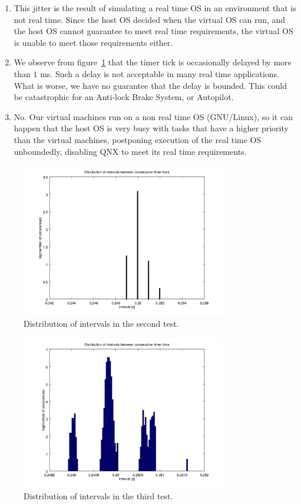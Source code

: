 \documentclass[a4paper,twoside,11pt]{article}
\begin{document}
\begin{enumerate}
 \item This jitter is the result of simulating a real time OS in an environment that is not real time. Since the host OS decided when the virtual OS can run, and the host OS cannot guarantee to meet real time requirements, the virtual OS is unable to meet those requirements either.
 
 \item We observe from figure~\ref{fig:interval-jitter} that the timer tick is occasionally delayed by more than $1$ ms. Such a delay is not acceptable in many real time applications. What is worse, we have no guarantee that the delay is bounded. This could be catastrophic for an Anti-lock Brake System, or Autopilot.
 
 \item No. Our virtual machines run on a non real time OS (GNU/Linux), so it can happen that the host OS is very busy with tasks that have a higher priority than the virtual machines, postponing execution of the real time OS unboundedly, disabling QNX to meet its real time requirements.
 
\end{enumerate}

\begin{figure}
 \centering
 \includegraphics[width=0.8\textwidth]{./img/interval-jitter.png}
 \caption{Distribution of intervals in the second test.}
 \label{fig:interval-jitter}
\end{figure}
\begin{figure}
 \centering
 \includegraphics[width=0.8\textwidth]{./img/interval-jitter2.png}
 \caption{Distribution of intervals in the third test.}
 \label{fig:interval-jitter2}
\end{figure}
\end{document}
